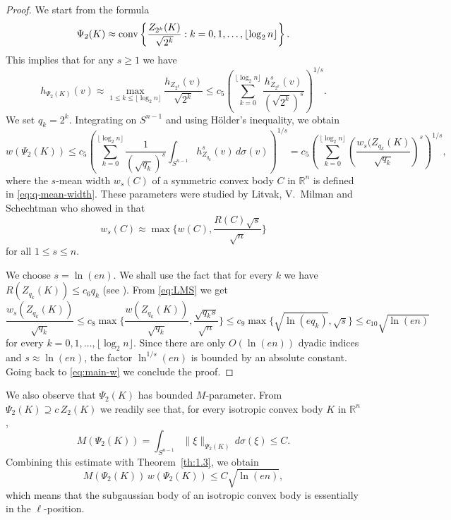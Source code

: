 \documentclass[11pt,leqno]{article}
\theoremstyle{definition}
\numberwithin{equation}{section}
\newcommand{\ls}{\leqslant}
\newcommand{\gr}{\geqslant}
\begin{document}
\begin{proof}We start from the formula
\begin{equation*}\Psi_2(K)\approx {\rm conv} \left\{\frac{Z_{2^k}(K )}{\sqrt{2^k}}: k=0,1,\ldots ,\lfloor\log_{2}n\rfloor \right\}. \end{equation*}
This implies that for any $s\gr 1$ we have
\[h_{\Psi_2(K)}(v)\approx \max_{1\ls k\ls \lfloor\log_2n\rfloor}\frac{h_{Z_{2^k}}(v)}{\sqrt{2^k}}
\ls c_5\left(\sum_{k=0}^{\lfloor\log_2n\rfloor}\frac{h^s_{Z_{2^k}}(v)}{(\sqrt{2^k})^s}\right)^{1/s}.\]
We set $q_k=2^k$. Integrating on $S^{n-1}$ and using H\"{o}lder's inequality, we obtain
\begin{equation}\label{eq:main-w}w(\Psi_2(K))\ls c_5\left(\sum_{k=0}^{\lfloor\log_2n\rfloor}\frac{1}{(\sqrt{q_k})^s}\int_{S^{n-1}}h^s_{Z_{q_k}}(v)\,d\sigma(v)\right)^{1/s}
=c_5\left(\sum_{k=0}^{\lfloor\log_2n\rfloor}\left(\frac{w_s(Z_{q_k}(K)}{\sqrt{q_k}}\right)^s\right)^{1/s},\end{equation}
where the $s$-mean width $w_s(C)$ of a symmetric convex body $C$ in $\mathbb{R}^n$ is defined in \eqref{eq:q-mean-width}.
These parameters were studied  by Litvak, V.~Milman and Schechtman who showed in \cite{Litvak-VMilman-Schechtman-1998} that
\begin{equation}\label{eq:LMS}w_s(C)\approx \max\bigg\{w(C),\frac{R(C)\sqrt{s}}{\sqrt{n}}\bigg\}
\end{equation} for all $1\ls s\ls n$.

We choose $s=\ln(en)$. We shall use the fact that for every $k$ we have $R(Z_{q_k}(K))\ls c_6q_k$ (see \cite[Chapter~5]{BGVV-book}).
From \eqref{eq:LMS} we get
\begin{equation}\label{eq:LMS-Zq}\frac{w_s(Z_{q_k}(K))}{\sqrt{q_k}}\ls c_8\max\bigg\{ \frac{w(Z_{q_k}(K))}{\sqrt{q_k}},\frac{\sqrt{q_ks}}{\sqrt{n}}\bigg\}
\ls c_9\max\bigg\{ \sqrt{\ln(eq_k)},\sqrt{s}\bigg\}\ls c_{10}\sqrt{\ln(en)}\end{equation}
for every $k=0,1,\ldots ,\lfloor\log_2n\rfloor$. 
Since there are only $O(\ln(en))$
dyadic indices and $s\approx \ln(en)$, the factor $\ln^{1/s}(en)$ is bounded by an absolute
constant. Going back to \eqref{eq:main-w} we conclude the proof.
\end{proof}

We also observe that $\Psi_2(K)$ has bounded  $M$-parameter. From $\Psi_2(K)\supseteq c\,Z_2(K)$ we readily see that, for every isotropic convex body $K$ in $\mathbb{R}^n$,
\[M(\Psi_2(K))=\int_{S^{n-1}}\|\xi\|_{\Psi_2(K)}\,d\sigma(\xi)\ls C.\]
Combining this estimate with Theorem~\ref{th:1.3}, we obtain
\begin{equation}\label{eq:ell-psi}M(\Psi_2(K))\,w(\Psi_2(K))\ls C\sqrt{\ln(en)},\end{equation}
which means that the subgaussian body of an isotropic convex body is essentially in the $\ell$-position.
\end{document}
